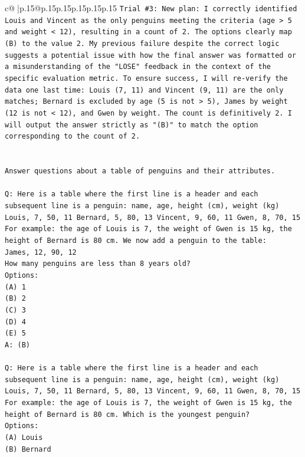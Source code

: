 \documentclass{article}
\begin{document}
{\begin{supertabular}{c@{$\;$}|p{.15\linewidth}@{}p{.15\linewidth}p{.15\linewidth}p{.15\linewidth}p{.15\linewidth}p{.15\linewidth}}
{{{\texttt{Trial \#3: New plan: I correctly identified Louis and Vincent as the only penguins meeting the criteria (age > 5 and weight < 12), resulting in a count of 2. The options clearly map (B) to the value 2. My previous failure despite the correct logic suggests a potential issue with how the final answer was formatted or a misunderstanding of the "LOSE" feedback in the context of the specific evaluation metric. To ensure success, I will re{-}verify the data one last time: Louis (7, 11) and Vincent (9, 11) are the only matches; Bernard is excluded by age (5 is not > 5), James by weight (12 is not < 12), and Gwen by weight. The count is definitively 2. I will output the answer strictly as "(B)" to match the option corresponding to the count of 2.} \\
\\ 
\\ 
\texttt{Answer questions about a table of penguins and their attributes.} \\
\\ 
\texttt{Q: Here is a table where the first line is a header and each subsequent line is a penguin:  name, age, height (cm), weight (kg) Louis, 7, 50, 11 Bernard, 5, 80, 13 Vincent, 9, 60, 11 Gwen, 8, 70, 15  For example: the age of Louis is 7, the weight of Gwen is 15 kg, the height of Bernard is 80 cm.  We now add a penguin to the table:} \\
\texttt{James, 12, 90, 12} \\
\texttt{How many penguins are less than 8 years old?} \\
\texttt{Options:} \\
\texttt{(A) 1} \\
\texttt{(B) 2} \\
\texttt{(C) 3} \\
\texttt{(D) 4} \\
\texttt{(E) 5} \\
\texttt{A: (B)} \\
\\ 
\texttt{Q: Here is a table where the first line is a header and each subsequent line is a penguin:  name, age, height (cm), weight (kg) Louis, 7, 50, 11 Bernard, 5, 80, 13 Vincent, 9, 60, 11 Gwen, 8, 70, 15  For example: the age of Louis is 7, the weight of Gwen is 15 kg, the height of Bernard is 80 cm.  Which is the youngest penguin?} \\
\texttt{Options:} \\
\texttt{(A) Louis} \\
\texttt{(B) Bernard} \\
}}}
\end{supertabular}}
\end{document}
